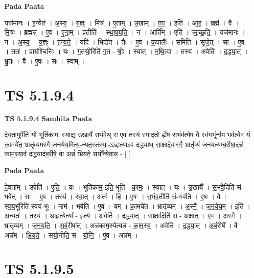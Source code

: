 \documentclass[17pt]{extarticle}
\begin{document}
\textbf{Pada Paata} \newline

यज॑मानः । ह॒न्येत॑ । अ॒स्य॒ । य॒ज्ञ्ः । मित्र॑ । ए॒ताम् । उ॒खाम् । त॒प॒ । इति॑ । आ॒ह॒ । ब्रह्म॑ । वै । मि॒त्रः । ब्रह्मन्न्॑ । ए॒व । ए॒ना॒म् । प्रतीति॑ । स्था॒प॒य॒ति॒ । न । आर्ति᳚म् । एति॑ । ऋ॒च्छ॒ति॒ । यज॑मानः । न । अ॒स्य॒ । य॒ज्ञ्ः । ह॒न्य॒ते॒ । यदि॑ । भिद्ये॑त । तैः । ए॒व । क॒पालैः᳚ । समिति॑ । सृ॒जे॒त् । सा । ए॒व । ततः॑ । प्राय॑श्चित्तिः । यः । ग॒तश्री॒रिति॑ ग॒त - श्रीः॒ । स्यात् । म॒थि॒त्वा । तस्य॑ । अवेति॑ । द॒द्ध्या॒त् । भू॒तः । वै । ए॒षः । सः । स्वाम् ।  \newline





\section{ TS 5.1.9.4 }

\textbf{TS 5.1.9.4 } \newline
\textbf{Samhita Paata} \newline

दे॒वता॒मुपै॑ति॒ यो भूति॑कामः॒ स्याद्य उ॒खायै॑ स॒भंवे॒थ् स ए॒व तस्य॑ स्या॒दतो॒ ह्ये॑ष स॒भंव॑त्ये॒ष वै स्व॑य॒भूंर्नाम॒ भव॑त्ये॒व यं का॒मये॑त॒ भ्रातृ॑व्यमस्मै जनयेय॒मित्य॒-न्यत॒स्तस्या॒-ऽऽहृत्याऽव॑ दद्ध्याथ् सा॒क्षादे॒वास्मै॒ भ्रातृ॑व्यं जनयत्यम्ब॒रीषा॒दन्न॑ काम॒स्याव॑ दद्ध्यादंब॒रीषे॒ वा अन्नं॑ भ्रियते॒ सयो᳚न्ये॒वान्न॒ - [  ] \newline

\textbf{Pada Paata} \newline

दे॒वता᳚म् । उपेति॑ । ए॒ति॒ । यः । भूति॑काम॒ इति॒ भूति॑ - का॒मः॒ । स्यात् । यः । उ॒खायै᳚ । स॒भंवे॒दिति॑ सं - भवे᳚त् । सः । ए॒व । तस्य॑ । स्या॒त् । अतः॑ । हि । ए॒षः । स॒भंव॒तीति॑ सं-भव॑ति । ए॒षः । वै । स्व॒य॒भूंरिति॑ स्वयं-भूः । नाम॑ । भव॑ति । ए॒व । यम् । का॒मये॑त । भ्रातृ॑व्यम् । अ॒स्मै॒ । ज॒न॒ये॒य॒म् । इति॑ । अ॒न्यतः॑ । तस्य॑ । आ॒हृत्येत्या᳚ - हृत्य॑ । अवेति॑ । द॒द्ध्या॒त् । सा॒क्षादिति॑ स - अ॒क्षात् । ए॒व । अ॒स्मै॒ । भ्रातृ॑व्यम् । ज॒न॒य॒ति॒ । अ॒बं॒रीषा᳚त् । अन्न॑काम॒स्येत्यन्न॑ - का॒म॒स्य॒ । अवेति॑ । द॒द्ध्या॒त् । अ॒बं॒रीषे᳚ । वै । अन्न᳚म् । भ्रि॒य॒ते॒ । सयो॒नीति॒ स - यो॒नि॒ । ए॒व । अन्न᳚म् ।  \newline





\section{ TS 5.1.9.5 }
\end{document}
